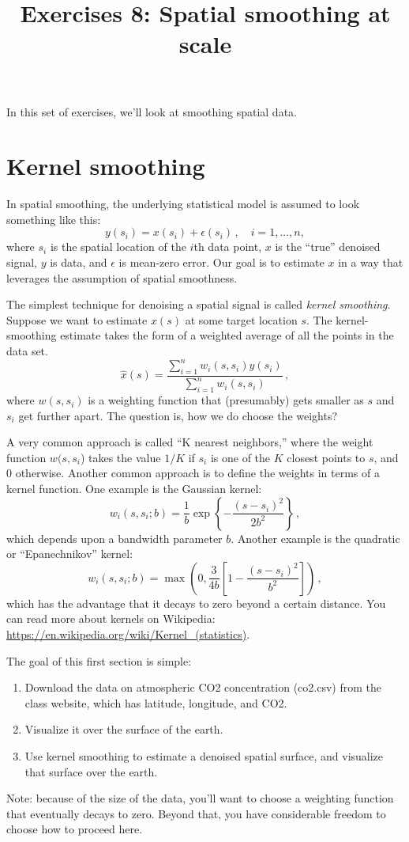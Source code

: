 \documentclass{mynotes}
\title[Exercises 8 $\cdot$ SDS 385]{Exercises 8: Spatial smoothing at scale}
\date{}  %
\begin{document}
\maketitle%

\bigskip


In this set of exercises, we'll look at smoothing spatial data.

\section{Kernel smoothing}

In spatial smoothing, the underlying statistical model is assumed to look something like this:
$$
y(s_i) = x(s_i) + \epsilon(s_i) \, , \quad i = 1, \ldots, n, 
$$
where $s_i$ is the spatial location of the $i$th data point, $x$ is the ``true'' denoised signal, $y$ is data, and $\epsilon$ is mean-zero error.  Our goal is to estimate $x$ in a way that leverages the assumption of spatial smoothness.

The simplest technique for denoising a spatial signal is called \textit{kernel smoothing}.  Suppose we want to estimate $x(s)$ at some target location $s$.  The kernel-smoothing estimate takes the form of a weighted average of all the points in the data set.
$$
\hat{x}(s) = \frac{\sum_{i=1}^n w_i(s, s_i) y(s_i)} {\sum_{i=1}^n w_i(s, s_i)} \, ,
$$
where $w(s, s_i)$ is a weighting function that (presumably) gets smaller as $s$ and $s_i$ get further apart.  The question is, how we do choose the weights?

A very common approach is called ``K nearest neighbors,'' where the weight function $w(s, s_i$) takes the value $1/K$ if $s_i$ is one of the $K$ closest points to $s$, and 0 otherwise.  Another common approach is to define the weights in terms of a kernel function.  One example is the Gaussian kernel:
$$
w_i(s, s_i; b) = \frac{1}{b} \exp \left\{ -\frac{(s - s_i)^2}{2b^2}  \right\}\, ,
$$
which depends upon a bandwidth parameter $b$.  Another example is the quadratic or ``Epanechnikov'' kernel:
$$
w_i(s, s_i; b) = \max \left( 0, \frac{3}{4b} \left[ 1 - \frac{(s - s_i)^2}{b^2} \right]  \right) \, ,
$$
which has the advantage that it decays to zero beyond a certain distance. You can read more about kernels on Wikipedia: \url{https://en.wikipedia.org/wiki/Kernel_(statistics)}.

The goal of this first section is simple:
\begin{enumerate}
\item Download the data on atmospheric CO2 concentration (co2.csv) from the class website, which has latitude, longitude, and CO2.
\item Visualize it over the surface of the earth.
\item Use kernel smoothing to estimate a denoised spatial surface, and visualize that surface over the earth.
\end{enumerate}
Note: because of the size of the data, you'll want to choose a weighting function that eventually decays to zero.  Beyond that, you have considerable freedom to choose how to proceed here.
\end{document}
